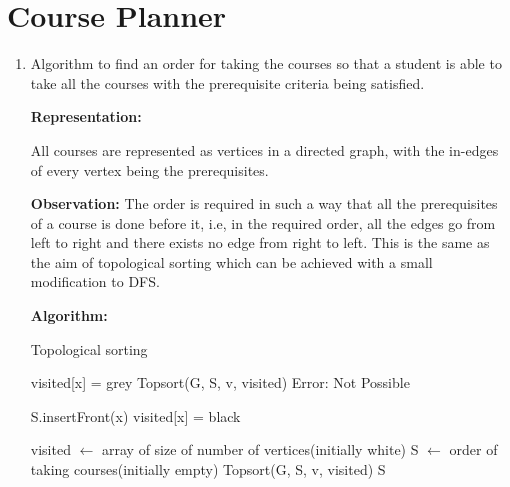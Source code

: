 \documentclass[a4paper]{article}
\begin{document}
\section{Course Planner}
\begin{enumerate}[1.]
\item Algorithm to find an order for taking the courses so that a student is able to take all the courses with the prerequisite criteria being satisfied.

    \textbf{Representation:}
    
    All courses are represented as vertices in a directed graph, with the in-edges of every vertex being the prerequisites. 
    
    \textbf{Observation:}
    The order is required in such a way that all the prerequisites of a course is done before it, i.e, in the required order, all the edges go from left to right and there exists no edge from right to left. This is the same as the aim of topological sorting which can be achieved with a small modification to DFS.
    
    \textbf{Algorithm:}
    
    {\centering
    \begin{minipage}{\linewidth}
    \begin{algorithm}[H]
    \caption{Topological sorting}\label{alg:ts}
    \begin{algorithmic}[1]
    \State visited[x] = grey
            \State Topsort(G, S, v, visited) 
        \EndIf
            \State \Return Error: Not Possible 
        \EndIf
        
    \EndFor
    \State S.insertFront(x)
    \State visited[x] = black
    
    
    \EndProcedure
    
    \State visited $\gets$ array of size of number of vertices(initially white)
    \State S $\gets$ order of taking courses(initially empty)
            \State Topsort(G, S, v, visited) 
        \EndIf
    \EndFor
    \State \Return S
    \EndProcedure
    \end{algorithmic}
    \end{algorithm}
    \end{minipage}
    \par}
    

\end{enumerate}
\end{document}
